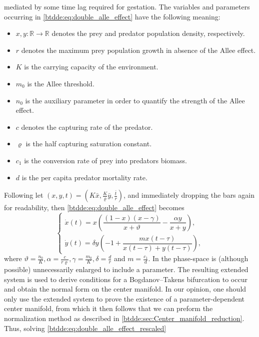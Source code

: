 mediated by some time lag required for gestation.
The variables and parameters occurring in \cref{btdde:eq:double_alle_effect}
have the following meaning:
\begin{itemize}
\item $x,y\colon \mathbb R \rightarrow \mathbb R$ denotes the prey and predator population density, respectively.
\item $r$ denotes the maximum prey population growth in absence of the Allee effect.
\item $K$ is the carrying capacity of the environment.
\item $m_0$ is the Allee threshold.
\item $n_0$ is the auxiliary parameter in order to quantify the strength of the Allee effect.
\item $c$ denotes the capturing rate of the predator.
\item $\varrho$ is the half capturing saturation constant.
\item $c_1$ is the conversion rate of prey into predators biomass.
\item $d$ is the per capita predator mortality rate.
\end{itemize}
Following \cite{Jiao2021} let $(x,y,t) = \left(K\bar x, \frac K \varrho \bar y, \frac{\bar t}r\right)$, and immediately 
dropping the bars again for readability, then \cref{btdde:eq:double_alle_effect} becomes
\begin{equation}
\label{btdde:eq:double_alle_effect_rescaled}
\begin{cases}
    \dot x(t) = x \left( \dfrac{(1-x)(x-\gamma)}{x+\vartheta} - \dfrac{\alpha y}{x+y} \right), \\
    \dot y(t) = \delta y \left( -1 + \dfrac{ m x(t-\tau) }{ x(t-\tau) + y(t-\tau) }\right),
\end{cases}
\end{equation}
where $\vartheta = \frac{n_0}K, \alpha=\frac c{r\varrho}, \gamma = \frac{m_0}K, \delta = \frac dr$ and $m=\frac{c_1}d$.
In \cite{Jiao2021} the phase-space is (although possible) unnecessarily
enlarged to include a parameter. The resulting extended system is used to
derive conditions for a Bogdanov--Takens bifurcation to occur and obtain the
normal form on the center manifold. In our opinion, one should only use the
extended system to prove the existence of a parameter-dependent center manifold,
from which it then follows that we can preform the normalization method as
described in \cref{btdde:sec:Center_manifold_reduction}. Thus, solving \cref{btdde:eq:double_alle_effect_rescaled}
